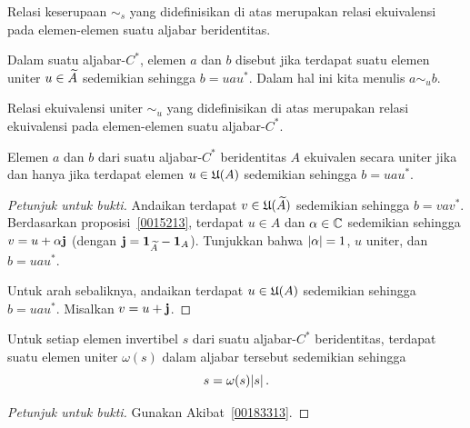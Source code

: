 \begin{prop} Relasi keserupaan $\sim_s$ yang didefinisikan di atas merupakan relasi ekuivalensi pada elemen-elemen suatu aljabar beridentitas.
\end{prop}

\begin{defn} Dalam suatu aljabar-$C^*$, elemen $a$ dan $b$ disebut
 jika terdapat suatu elemen uniter $u \in \widetilde{A}$ sedemikian sehingga $b = uau^*$. %
Dalam hal ini kita menulis $a \sim_u b$.
\end{defn}

\begin{prop} Relasi ekuivalensi uniter $\sim_u$ yang didefinisikan di atas merupakan relasi ekuivalensi pada elemen-elemen suatu aljabar-$C^*$.
\end{prop}

\begin{prop}\label{0060224fa} Elemen $a$ dan $b$ dari suatu aljabar-$C^*$ beridentitas $A$ ekuivalen secara uniter jika dan hanya jika
terdapat elemen $u \in \mathfrak{U}(A)$ sedemikian sehingga $b = uau^*$.
\end{prop}

\begin{proof}[\emph{Petunjuk untuk bukti}] Andaikan terdapat $v \in \mathfrak{U}(\widetilde{A})$ sedemikian sehingga $b = vav^*$. Berdasarkan proposisi~\ref{0015213},
terdapat $u \in A$ dan $\alpha \in \mathbb{C}$ sedemikian sehingga $v = u + \alpha \mathbf{j}$ (dengan $\mathbf{j} = \mathbf{1}_{\widetilde{A}} - \mathbf{1}_A$). Tunjukkan
bahwa $\lvert\alpha\rvert = 1$, $u$ uniter, dan $b = uau^*$.

Untuk arah sebaliknya, andaikan terdapat $u \in \mathfrak{U}(A)$ sedemikian sehingga $b = uau^*$. Misalkan $v = u + \mathbf{j}$. \ns
\end{proof}

\begin{prop}\label{0060141} Untuk setiap elemen invertibel $s$ dari suatu
aljabar-$C^*$ beridentitas, terdapat suatu elemen uniter $\omega(s)$ dalam aljabar tersebut sedemikian sehingga %
   \[   s = \omega(s) \lvert s\rvert\,. \]
\end{prop}

\begin{proof}[\emph{Petunjuk untuk bukti}] Gunakan Akibat~\ref{00183313}.   \ns
\end{proof}

